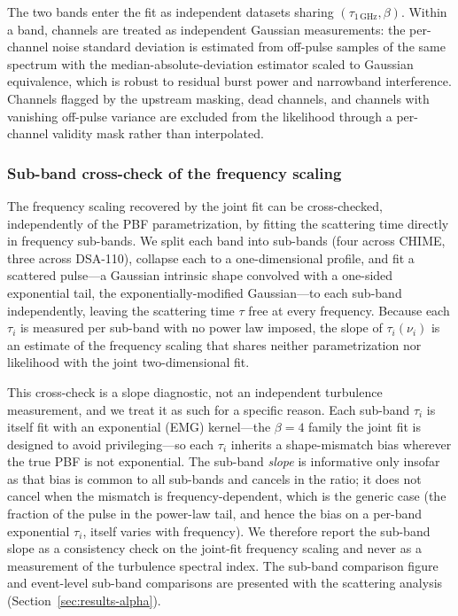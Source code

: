 The two bands enter the fit as independent datasets sharing
$(\tau_{1\,\mathrm{GHz}},\beta)$. Within a band, channels are treated as
independent Gaussian measurements: the per-channel noise standard deviation
is estimated from off-pulse samples of the same spectrum with the
median-absolute-deviation estimator scaled to Gaussian equivalence, which is
robust to residual burst power and narrowband interference. Channels flagged
by the upstream masking, dead channels, and channels with vanishing
off-pulse variance are excluded from the likelihood through a per-channel
validity mask rather than interpolated.

\subsubsection{Sub-band cross-check of the frequency scaling}
\label{sec:subband}
\label{sec:beta-subband}

The frequency scaling recovered by the joint fit can be cross-checked,
independently of the PBF parametrization, by fitting the scattering time
directly in frequency sub-bands. We split each band into sub-bands (four across CHIME, three across
DSA-110), collapse each to a one-dimensional profile, and fit a scattered
pulse---a Gaussian intrinsic shape convolved with a one-sided exponential tail,
the exponentially-modified Gaussian---to each sub-band independently, leaving the
scattering time $\tau$ free at every frequency. Because each $\tau_i$ is measured
per sub-band with no power law imposed, the slope of $\tau_i(\nu_i)$ is an
estimate of the frequency scaling that shares neither parametrization nor
likelihood with the joint two-dimensional fit.

This cross-check is a slope diagnostic, not an independent turbulence
measurement, and we treat it as such for a specific reason. Each sub-band $\tau_i$
is itself fit with an exponential (EMG) kernel---the $\beta=4$ family the joint
fit is designed to avoid privileging---so each $\tau_i$ inherits a shape-mismatch
bias wherever the true PBF is not exponential. The sub-band \emph{slope} is
informative only insofar as that bias is common to all sub-bands and cancels in
the ratio; it does not cancel when the mismatch is frequency-dependent, which is
the generic case (the fraction of the pulse in the power-law tail, and hence the
bias on a per-band exponential $\tau_i$, itself varies with frequency). We
therefore report the sub-band slope as a consistency
check on the joint-fit frequency scaling and never as a measurement of the
turbulence spectral index. The sub-band comparison figure and event-level
sub-band comparisons are presented with the scattering analysis
(Section~\ref{sec:results-alpha}).

